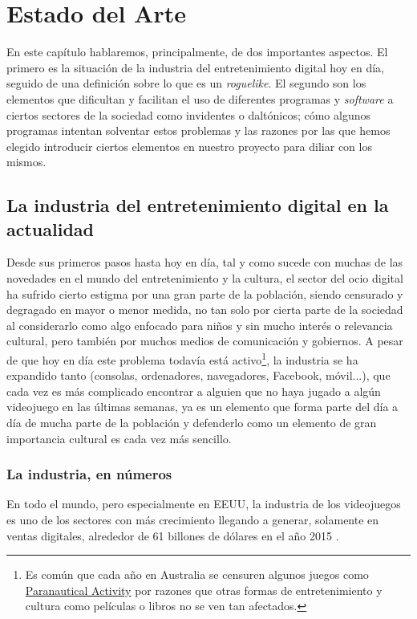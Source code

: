 \chapter{Estado del Arte}

En este capítulo hablaremos, principalmente, de dos importantes aspectos. El primero es la situación de la industria del entretenimiento digital hoy en día, seguido de una definición sobre lo que es un \textit{roguelike}. El segundo son los elementos que dificultan y facilitan el uso de diferentes programas y \textit{software} a ciertos sectores de la sociedad como invidentes o daltónicos; cómo algunos programas intentan solventar estos problemas y las razones por las que hemos elegido introducir ciertos elementos en nuestro proyecto para diliar con los mismos.

\section{La industria del entretenimiento digital en la actualidad}

Desde sus primeros pasos hasta hoy en día, tal y como sucede con muchas de las novedades en el mundo del entretenimiento y la cultura, el sector del ocio digital ha sufrido cierto estigma por una gran parte de la población, siendo censurado y degragado en mayor o menor medida, no tan solo por cierta parte de la sociedad al considerarlo como algo enfocado para niños y sin mucho interés o relevancia cultural, pero también por muchos medios de comunicación y gobiernos. A pesar de que hoy en día este problema todavía está activo\footnote{Es común que cada año en Australia se censuren algunos juegos como \href{http://goo.gl/hFrQah}{Paranautical Activity} por razones que otras formas de entretenimiento y cultura como películas o libros no se ven tan afectados.}, la industria se ha expandido tanto (consolas, ordenadores, navegadores, Facebook, móvil...), que cada vez es más complicado encontrar a alguien que no haya jugado a algún videojuego en las últimas semanas, ya es un elemento que forma parte del día a día de mucha parte de la población y defenderlo como un elemento de gran importancia cultural es cada vez más sencillo.

\subsection{La industria, en números}
En todo el mundo, pero especialmente en EEUU, la industria de los videojuegos es uno de los sectores con más crecimiento \cite{website:gamesimprovingeconomy} llegando a generar, solamente en ventas digitales, alrededor de 61 billones de dólares en el año 2015 \cite{website:gamingsales}.

